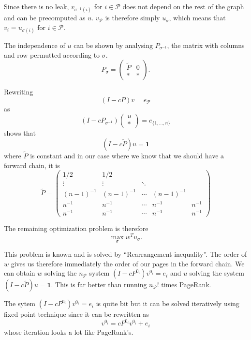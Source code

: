 \documentclass{article}
\newcommand{\1}{\mathbf{1}}
\theoremstyle{definition}
\begin{document}
Since there is no leak, $v_{\sigma^{-1}(i)}$ for $i \in \mathcal{P}$ does not depend on the rest of the graph and can be precomputed as \(u\).
$v_\mathcal{P}$ is therefore simply $u_\sigma$, which means that $v_i = u_{\sigma(i)}$ for $i \in \mathcal{P}$.

The independence of $u$ can be shown by analysing $P_{\sigma^{-1}}$, the matrix with columns and row permutted according to $\sigma$.
\[ P_\sigma =
  \begin{pmatrix}
    \tilde{P} & 0\\
    * & *
  \end{pmatrix}.
\]

Rewriting
\[ (I - cP)v = e_\mathcal{P} \]
as
\[ (I - cP_{\sigma^{-1}})
\begin{pmatrix}
u\\
*
\end{pmatrix}
= e_{\{1,\ldots,n\}} \]
shows that
\[ (I - c\tilde{P})u = \1 \]
where $\tilde{P}$ is constant and in our case
where we know that we should have a forward chain, it is
\[
  \tilde{P} =
  \begin{pmatrix}
    1/2 & 1/2 & & &\\
    \vdots & \vdots & \ddots & &\\
    (n-1)^{-1} & (n-1)^{-1} & \cdots & (n-1)^{-1} & \\
    n^{-1} & n^{-1} & \cdots & n^{-1} & n^{-1}\\
    n^{-1} & n^{-1} & \cdots & n^{-1} & n^{-1}
  \end{pmatrix}
\]

The remaining optimization problem is therefore
\[ \max_\sigma w^T u_\sigma. \]

This problem is known and is solved by ``Rearrangement inequality''.
The order of \(w\) gives us therefore immediately the order of our pages in the forward chain.
We can obtain \(w\) solving the \(n_\mathcal{P}\) system \((I - cP^{0_i})v^{0_i} = e_i\)
and \(u\) solving the system \((I - c\tilde{P})u = \1\).
This is far better than running \(n_\mathcal{P}!\) times PageRank.

The sytem \((I - cP^{0_i})v^{0_i} = e_i\) is quite bit but it can be solved iteratively using fixed point technique since
it can be rewritten as
\[ v^{0_i} = cP^{0_i}v^{0_i} + e_i \]
whose iteration looks a lot like PageRank's.
\end{document}
